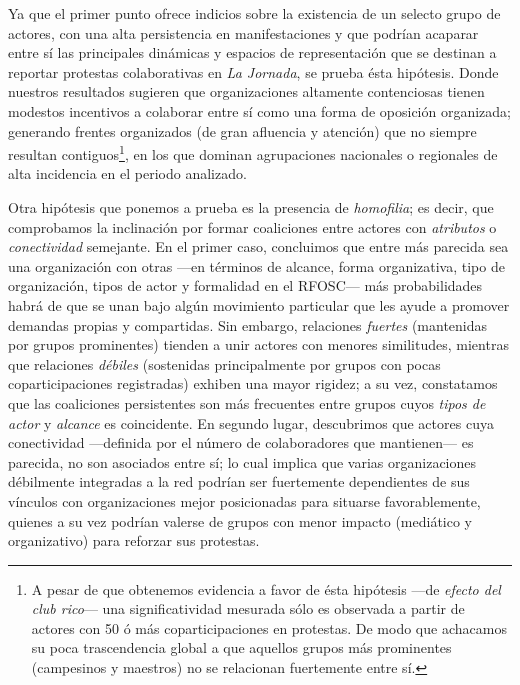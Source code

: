 \documentclass[letterpaper, 11pt]{book}
\theoremstyle{definition}
\theoremstyle{remark}
\begin{document}
Ya que el primer punto ofrece indicios sobre la existencia de un selecto grupo de actores, con una alta persistencia en manifestaciones y que podrían acaparar entre sí las principales dinámicas y espacios de representación que se destinan a reportar protestas colaborativas en \emph{La Jornada}, se prueba ésta hipótesis. 
Donde nuestros resultados sugieren que organizaciones altamente contenciosas tienen modestos incentivos a colaborar entre sí como una forma de oposición organizada; generando frentes organizados (de gran afluencia y atención) que no siempre resultan contiguos\footnote{
    A pesar de que obtenemos evidencia a favor de ésta hipótesis ---de \emph{efecto del club rico}--- una significatividad mesurada sólo es observada a partir de actores con 50 ó más coparticipaciones en protestas. 
    De modo que achacamos su poca trascendencia global a que aquellos grupos más prominentes (campesinos y maestros) no se relacionan fuertemente entre sí. 
}, en los que dominan agrupaciones nacionales o regionales de alta incidencia en el periodo analizado. 



Otra hipótesis que ponemos a prueba es la presencia de \emph{homofilia}; es decir, que comprobamos la inclinación por formar coaliciones entre actores con \emph{atributos} o \emph{conectividad} semejante. 
En el primer caso,  concluimos que entre más parecida sea una organización con otras ---en términos de alcance, forma organizativa, tipo de organización, tipos de actor y formalidad en el RFOSC--- más probabilidades habrá de que se unan bajo algún movimiento particular que les ayude a promover demandas propias y compartidas. 
Sin embargo, relaciones \emph{fuertes} (mantenidas por grupos prominentes) tienden a unir actores con menores similitudes, mientras que relaciones \emph{débiles} (sostenidas principalmente por grupos con pocas coparticipaciones registradas) exhiben una mayor rigidez; a su vez, constatamos que las coaliciones persistentes son más frecuentes entre grupos cuyos \emph{tipos de actor} y \emph{alcance} es coincidente. 
En segundo lugar, descubrimos que actores cuya conectividad ---definida por el número de colaboradores que mantienen--- es parecida, no son asociados entre sí; lo cual implica que varias organizaciones débilmente integradas a la red podrían ser fuertemente dependientes de sus vínculos con organizaciones mejor posicionadas para situarse favorablemente, quienes a su vez podrían valerse de grupos con menor impacto (mediático y organizativo) para reforzar sus protestas. 
\end{document}

